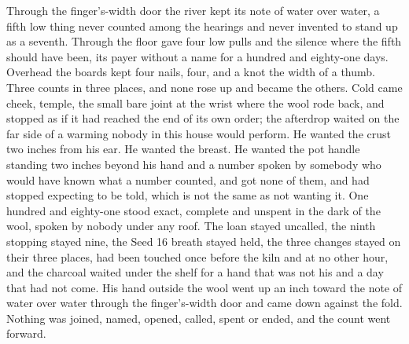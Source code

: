 \scenebreak

Through the finger's-width door the river kept its note of water over water, a fifth low thing never counted among the hearings and never invented to stand up as a seventh. Through the floor  gave four low pulls and the silence where the fifth should have been, its payer without a name for a hundred and eighty-one days. Overhead the boards kept four nails, four, and a knot the width of a thumb. Three counts in three places, and none rose up and became the others. Cold came cheek, temple, the small bare joint at the wrist where the wool rode back, and stopped as if it had reached the end of its own order; the afterdrop waited on the far side of a warming nobody in this house would perform. He wanted the crust two inches from his ear. He wanted the breast. He wanted the pot handle standing two inches beyond his hand and a number spoken by somebody who would have known what a number counted, and got none of them, and had stopped expecting to be told, which is not the same as not wanting it. One hundred and eighty-one stood exact, complete and unspent in the dark of the wool, spoken by nobody under any roof. The loan stayed uncalled, the ninth stopping stayed nine, the Seed 16 breath stayed held, the three changes stayed on their three places,  had been touched once before the kiln and at no other hour, and the charcoal waited under the shelf for a hand that was not his and a day that had not come. His hand outside the wool went up an inch toward the note of water over water through the finger's-width door and came down against the fold. Nothing was joined, named, opened, called, spent or ended, and the count went forward.
